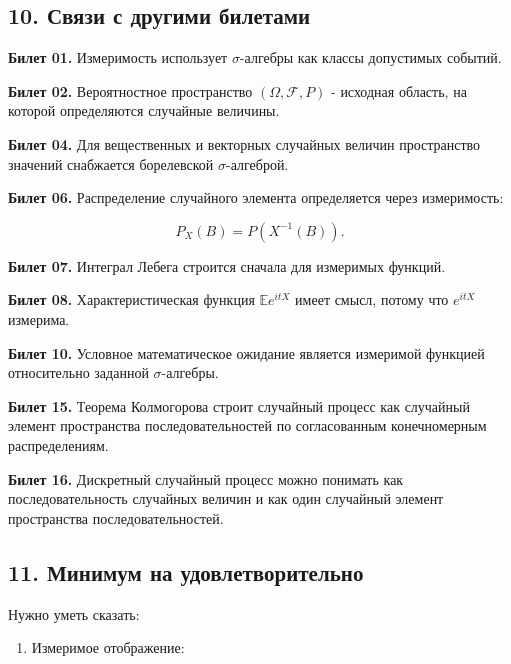 \documentclass[
  11pt,
  a4paper,
]{article}
\providecommand{\tightlist}{%
  \setlength{\itemsep}{0pt}\setlength{\parskip}{0pt}}
\begin{document}
\subsection{10. Связи с другими
билетами}\label{ux441ux432ux44fux437ux438-ux441-ux434ux440ux443ux433ux438ux43cux438-ux431ux438ux43bux435ux442ux430ux43cux438}

\textbf{Билет 01.} Измеримость использует \(\sigma\)-алгебры как классы
допустимых событий.

\textbf{Билет 02.} Вероятностное пространство \((\Omega,\mathcal F,P)\)
- исходная область, на которой определяются случайные величины.

\textbf{Билет 04.} Для вещественных и векторных случайных величин
пространство значений снабжается борелевской \(\sigma\)-алгеброй.

\textbf{Билет 06.} Распределение случайного элемента определяется через
измеримость:

\[
P_X(B)=P(X^{-1}(B)).
\]

\textbf{Билет 07.} Интеграл Лебега строится сначала для измеримых
функций.

\textbf{Билет 08.} Характеристическая функция \(\mathbb E e^{itX}\)
имеет смысл, потому что \(e^{itX}\) измерима.

\textbf{Билет 10.} Условное математическое ожидание является измеримой
функцией относительно заданной \(\sigma\)-алгебры.

\textbf{Билет 15.} Теорема Колмогорова строит случайный процесс как
случайный элемент пространства последовательностей по согласованным
конечномерным распределениям.

\textbf{Билет 16.} Дискретный случайный процесс можно понимать как
последовательность случайных величин и как один случайный элемент
пространства последовательностей.

\subsection{11. Минимум на
удовлетворительно}\label{ux43cux438ux43dux438ux43cux443ux43c-ux43dux430-ux443ux434ux43eux432ux43bux435ux442ux432ux43eux440ux438ux442ux435ux43bux44cux43dux43e}

Нужно уметь сказать:

\begin{enumerate}
\def\labelenumi{\arabic{enumi}.}
\tightlist
\item
  Измеримое отображение:
\end{enumerate}
\end{document}
